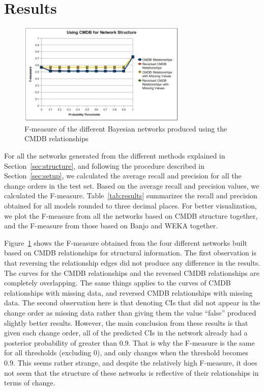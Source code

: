 \documentclass[10pt,twocolumn,letterpaper]{article}
\begin{document}
\section{Results}
\label{sec:results}

\begin{figure}[!t]
\centering
\includegraphics[width=8cm]{graphics/cmdbresults.png}
\caption{F-measure of the different Bayesian networks produced using the CMDB relationships}
\label{fig:cmdbresults}
\end{figure}

For all the networks generated from the different methods explained in Section~\ref{sec:structure}, and following the procedure described in
Section~\ref{sec:setup}, we calculated the average recall and precision for all the change orders in the test set. Based on the average recall and precision
values, we calculated the F-measure. Table~\ref{tab:results} summarizes the recall and precision obtained for all models rounded to three decimal places. For
better visualization, we plot the
F-measure from all the networks based on CMDB structure together, and the F-measure from those based on Banjo and WEKA together.

Figure~\ref{fig:cmdbresults} shows the F-measure obtained from the four different networks built based on CMDB relationships for structural information. The
first observation is that reversing the relationship edges did not produce any difference in the results. The curves for the CMDB relationships and the reversed
CMDB relationships are completely overlapping. The same things applies to the curves of CMDB relationships with missing data, and reversed CMDB relationships
with missing data. The second observation here is that denoting CIs that did not appear in the change order as missing data rather than giving them the value
``false'' produced slightly better results. However, the main conclusion from these results is that given each change order, all of the predicted CIs in the
network already had a posterior probability of greater than 0.9. That is why the F-measure is the same for all thresholds (excluding 0), and only
changes when the threshold becomes 0.9. This seems rather strange, and despite the relatively high F-measure, it does not seem that the structure
of these networks is reflective of their relationships in terms of change.
\end{document}
